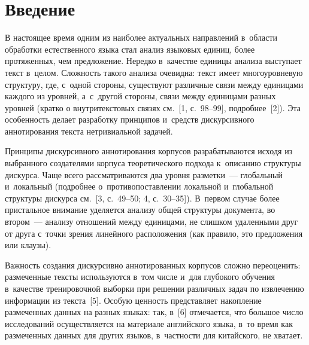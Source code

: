   




\thispagestyle{headings}

\begin{multicols}{2}

\label{st\stat}

\section{Введение}

В настоящее время одним из наиболее актуальных направлений в~области 
обработки естественного языка стал анализ языковых единиц, более 
протяженных, чем предложение. Нередко в~качестве единицы анализа 
выступает текст в~целом. Сложность такого анализа очевидна: текст имеет 
многоуровневую структуру, где, с~одной стороны, существуют различные 
связи между единицами каж\-до\-го из уровней, а~с~другой стороны, связи 
между единицами разных уровней (кратко о внутритекстовых связях см.~[1, 
с.~98--99], подробнее~[2]). Эта особенность делает разработку принципов 
и~средств дискурсивного аннотирования текста нетривиальной задачей.

Принципы дискурсивного аннотирования корпусов разрабатываются исходя 
из выбранного создателями корпуса теоретического подхода к~описанию 
структуры дискурса. Чаще всего \mbox{рассматриваются} два уровня разметки~--- 
глобальный и~локальный (подробнее о~противопоставлении локальной 
и~глобальной структуры дискурса см.~[3, с.~49--50; 4, с.~30--35]). В~первом 
случае более пристальное внимание уделяется анализу общей структуры 
документа, во втором~--- анализу отношений между единицами, не слишком 
удаленными друг от друга с~точки зрения линейного расположения (как 
правило, это предложения или клаузы).

Важность создания дискурсивно аннотированных корпусов сложно 
переоценить: размеченные тексты используются в~том числе и~для глубокого 
обучения в~качестве тренировочной выборки при решении различных задач 
по извлечению информации из текста~[5]. Особую ценность представляет 
накопление размеченных данных на разных языках: так, в~[6] отмечается, 
что большое число исследований осуществляется на материале английского 
языка, в~то время как размеченных данных для других языков, в~частности 
для китайского, не хватает.


\end{multicols}
